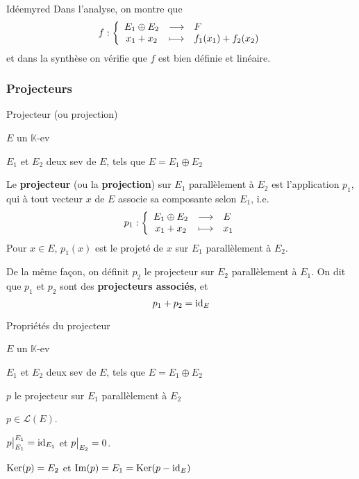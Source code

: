     \begin{demo}{Idée}{myred}
        Dans l’analyse, on montre que \[ \fonction{f}{E_1 \oplus E_2}{F}{x_1 + x_2}{f_1(x_1) + f_2(x_2)} \] et dans la synthèse on vérifie que $f$ est bien définie et linéaire.
    \end{demo}

    \subsubsection{Projecteurs}

    \begin{defi}{Projecteur (ou projection)}{}
        \begin{soient}
            \item $E$ un $\mathbb{K}$-ev
            \item $E_1$ et $E_2$ deux sev de $E$, tels que $E = E_1 \oplus E_2$
        \end{soient}
        Le \textbf{projecteur} (ou la \textbf{projection}) sur $E_1$ parallèlement à $E_2$ est l’application $p_1$, qui à tout vecteur $x$ de $E$ associe sa composante selon $E_1$, i.e. 
        \[ \fonction{p_1}{E_1 \oplus E_2}{E}{x_1 + x_2}{x_1} \]
        Pour $x \in E$, $p_1(x)$ est le projeté de $x$ sur $E_1$ parallèlement à $E_2$.

        De la même façon, on définit $p_2$ le projecteur sur $E_2$ parallèlement à $E_1$. On dit que $p_1$ et $p_2$ sont des \textbf{projecteurs associés}, et 
        \[ p_1 + p_2 = \operatorname{id}_E \]
    \end{defi}
    
    \begin{prop}{Propriétés du projecteur}{}
        \begin{soient}
            \item $E$ un $\mathbb{K}$-ev
            \item $E_1$ et $E_2$ deux sev de $E$, tels que $E = E_1 \oplus E_2$
            \item $p$ le projecteur sur $E_1$ parallèlement à $E_2$
        \end{soient}
        \begin{alors}
            \item $p \in \mathcal{L}(E)$.
            \item $\left.\kern-\nulldelimiterspace p \vphantom{\big|} \right|_{E_1}^{E_1} = \id_{E_1}$ et $\restr{p}{E_2} = 0$.
            \item $\operatorname{Ker}(p) = E_2$ et $\operatorname{Im}(p) = E_1 = \operatorname{Ker}(p - \operatorname{id}_E)$
        \end{alors}
    \end{prop}
    
